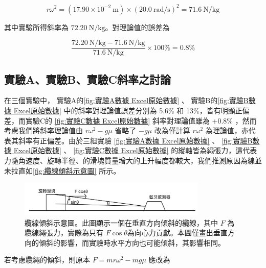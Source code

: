 \documentclass[11pt,a4paper]{article}
\theoremstyle{definition}
\begin{document}
            \begin{equation}
                r\omega^2 = (17.90 \times 10^{-2}\ \si{\meter}) \times (20.0\ \si{\radian\per\second})^2 = 71.6\ \si{\newton\per\kilogram}
            \end{equation}

            其中實驗所得斜率為 $\SI{72.20}{\newton\per\kilogram}$。對理論值的誤差為
            
            \begin{equation} 
                \frac{\SI{72.20}{\newton\per\kilogram} - \SI{71.6}{\newton\per\kilogram}}{\SI{71.6}{\newton\per\kilogram}} \times 100\% = 0.8\% 
            \end{equation}

        \subsection{實驗A、實驗B、實驗C斜率之討論}

            在三個實驗中， 實驗A的\autoref{fig:實驗A數據 Excel原始數據} 、 實驗B的\autoref{fig:實驗B數據 Excel原始數據} 中的斜率對理論值誤差分別為 5.6\% 和 13\%，皆有明顯正偏差，而實驗C的 \autoref{fig:實驗C數據 Excel原始數據} 斜率對理論值雖為 +0.8\% ，然而考慮我們將斜率理論值由 $r\omega^2 - g \mu$ 省略了 $-g \mu$ 改為僅計算 $r\omega^2$ 為理論值，亦代表其斜率有正偏差。由於三組實驗 \autoref{fig:實驗A數據 Excel原始數據} 、 \autoref{fig:實驗B數據 Excel原始數據} 、 \autoref{fig:實驗C數據 Excel原始數據} 的縱軸皆為繩張力，這代表力隨角速度、旋轉半徑、的滑塊質量增大的上升幅度都較大，我們推測原因為線並未拉直如\autoref{fig:纜線傾斜示意圖} 所示。

            \begin{figure}[H]
                \centering
                \includegraphics[width=0.8\textwidth]{纜線傾斜示意圖.png}
                \caption{纜線傾斜示意圖。此圖顯示一個在垂直方向傾斜的纜線，其中 $F$ 為纜線繩張力，實際為只有 $F \cos{\theta} $為向心力貢獻。本圖僅畫出垂直方向的傾斜的影響，而實驗時水平方向也可能傾斜，其影響相同。}
                \label{fig:纜線傾斜示意圖}
            \end{figure}

            若考慮纜繩的傾斜，則原本 $F = mr\omega^2 - m g \mu$ 應改為 
            
\end{document}
